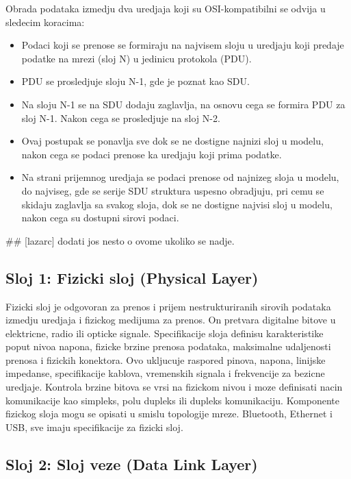 \documentclass[a4paper,12pt, master]{etf}
\begin{document}
	Obrada podataka izmedju dva uredjaja koji su OSI-kompatibilni se odvija u sledecim koracima:
	\begin{itemize}
		\item Podaci koji se prenose se formiraju na najvisem sloju u uredjaju koji predaje podatke
		na mrezi (sloj N) u jedinicu protokola (PDU).
		\item PDU se prosledjuje sloju N-1, gde je poznat kao SDU.
		\item Na sloju N-1 se na SDU dodaju zaglavlja, na osnovu cega se formira PDU za sloj N-1.
		Nakon cega se prosledjuje na sloj N-2.
		\item Ovaj postupak se ponavlja sve dok se ne dostigne najnizi sloj u modelu, nakon cega se
		podaci prenose ka uredjaju koji prima podatke.
		\item Na strani prijemnog uredjaja se podaci prenose od najnizeg sloja u modelu, do
		najviseg, gde se serije SDU struktura uspesno obradjuju, pri cemu se skidaju zaglavlja sa
		svakog sloja, dok se ne dostigne najvisi sloj u modelu, nakon cega su dostupni sirovi
		podaci.
	\end{itemize}

	\#\# [lazarc] dodati jos nesto o ovome ukoliko se nadje.

	\subsection{Sloj 1: Fizicki sloj (Physical Layer)}

	Fizicki sloj je odgovoran za prenos i prijem nestrukturiranih sirovih podataka izmedju uredjaja
	i fizickog medijuma za prenos. On pretvara digitalne bitove u elektricne, radio ili opticke
	signale. Specifikacije sloja definisu karakteristike poput nivoa napona, fizicke brzine prenosa
	podataka, maksimalne udaljenosti prenosa i fizickih konektora. Ovo ukljucuje raspored pinova,
	napona, linijske impedanse, specifikacije kablova, vremenskih signala i frekvencije za bezicne
	uredjaje. Kontrola brzine bitova se vrsi na fizickom nivou i moze definisati nacin komunikacije
	kao simpleks, polu dupleks ili dupleks komunikaciju. Komponente fizickog sloja mogu se opisati
	u smislu topologije mreze. Bluetooth, Ethernet i USB, sve imaju specifikacije za fizicki sloj.

	\subsection{Sloj 2: Sloj veze (Data Link Layer)}
\end{document}
